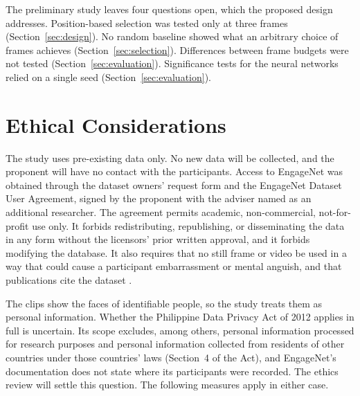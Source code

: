 The preliminary study leaves four questions open, which the proposed design addresses. Position-based selection was tested only at three frames (Section~\ref{sec:design}). No random baseline showed what an arbitrary choice of frames achieves (Section~\ref{sec:selection}). Differences between frame budgets were not tested (Section~\ref{sec:evaluation}). Significance tests for the neural networks relied on a single seed (Section~\ref{sec:evaluation}).



\section{Ethical Considerations}
\label{sec:ethics}

The study uses pre-existing data only. No new data will be collected, and the proponent will have no contact with the participants. Access to EngageNet was obtained through the dataset owners' request form and the EngageNet Dataset User Agreement, signed by the proponent with the adviser named as an additional researcher. The agreement permits academic, non-commercial, not-for-profit use only. It forbids redistributing, republishing, or disseminating the data in any form without the licensors' prior written approval, and it forbids modifying the database. It also requires that no still frame or video be used in a way that could cause a participant embarrassment or mental anguish, and that publications cite the dataset \cite{singh2023}.

The clips show the faces of identifiable people, so the study treats them as personal information. Whether the Philippine Data Privacy Act of 2012 \cite{ra10173} applies in full is uncertain. Its scope excludes, among others, personal information processed for research purposes and personal information collected from residents of other countries under those countries' laws (Section~4 of the Act), and EngageNet's documentation does not state where its participants were recorded. The ethics review will settle this question. The following measures apply in either case.

